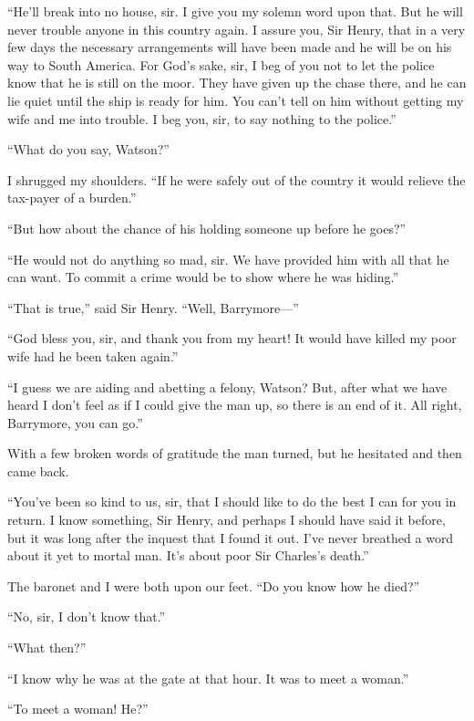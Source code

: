 \enquote{He'll break into no house, sir. I give you my solemn word upon that. But he will never trouble anyone in this country again. I assure you, Sir Henry, that in a very few days the necessary arrangements will have been made and he will be on his way to South America. For God's sake, sir, I beg of you not to let the police know that he is still on the moor. They have given up the chase there, and he can lie quiet until the ship is ready for him. You can't tell on him without getting my wife and me into trouble. I beg you, sir, to say nothing to the police.}

\enquote{What do you say, Watson?}

I shrugged my shoulders. \enquote{If he were safely out of the country it would relieve the tax-payer of a burden.}

\enquote{But how about the chance of his holding someone up before he goes?}

\enquote{He would not do anything so mad, sir. We have provided him with all that he can want. To commit a crime would be to show where he was hiding.}

\enquote{That is true,} said Sir Henry. \enquote{Well, Barrymore---}

\enquote{God bless you, sir, and thank you from my heart! It would have killed my poor wife had he been taken again.}

\enquote{I guess we are aiding and abetting a felony, Watson? But, after what we have heard I don't feel as if I could give the man up, so there is an end of it. All right, Barrymore, you can go.}

With a few broken words of gratitude the man turned, but he hesitated and then came back.

\enquote{You've been so kind to us, sir, that I should like to do the best I can for you in return. I know something, Sir Henry, and perhaps I should have said it before, but it was long after the inquest that I found it out. I've never breathed a word about it yet to mortal man. It's about poor Sir Charles's death.}

The baronet and I were both upon our feet. \enquote{Do you know how he died?}

\enquote{No, sir, I don't know that.}

\enquote{What then?}

\enquote{I know why he was at the gate at that hour. It was to meet a woman.}

\enquote{To meet a woman! He?}

